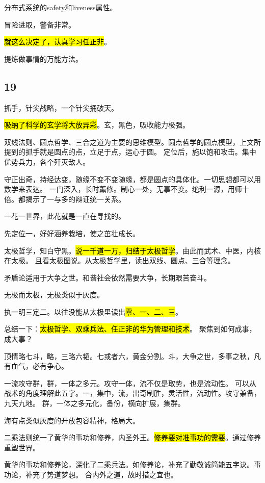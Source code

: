 分布式系统的safety和liveness属性。

冒险进取，警备非常。

\hl{就这么决定了，认真学习任正非}。

\hrulefill

提炼做事情的万能方法。

\subsection{19}

抓手，针尖战略，一个针尖捅破天。

\hl{吸纳了科学的玄学将大放异彩}。玄，黑色，吸收能力极强。

双线法则、圆点哲学、三合之道为主要的思维模型。圆点哲学的圆点模型，上文所提到的抓手就是圆点的点，立足于点，运心于圆。
定位后，施以饱和攻击。集中优势兵力，各个歼灭敌人。

守正出奇，持经达变，随缘不变不变随缘，都是圆点的具体化。一切思想都可以用数学来表达。
一门深入，长时薰修。制心一处，无事不变。绝利一源，用师十倍。都揭示了一与多的辩证统一关系。

一花一世界，此花就是一直在寻找的。

先定位一，好好涵养栽培，使之茁壮成长。

\hrulefill

太极哲学，知白守黑。\hl{说一千道一万，归结于太极哲学}。由此而武术、中医，内核在太极。
且看太极图说。从太极哲学里，读出双线、圆点、三合等理念。

矛盾论适用于大争之世。和谐社会依然需要大争，长期艰苦奋斗。

无极而太极，无极类似于灰度。

执一明三定二。以往没能从太极里读出\hl{零、一、二、三}。

总结一下：\hl{太极哲学、双乘兵法、任正非的华为管理和技术}。
聚焦到如何成事，成大事？

顶情略七斗，略，三略六韬。七或者六，黄金分割。斗，大争之世，多事之秋，凡有血气，必有争心。

一流攻守群，群，一体之多元。攻守一体，流不仅是取势，也是流动性。
可以从战术的角度理解此五字。一，集中，流，出奇制胜，灵活性，流动性。攻守兼备，九天九地。
群，一体之多元化，备份，横向扩展，集群。

海有点类似灰度的开放包容精神，格局大。

\hrulefill

二乘法则统一了黄华的事功和修养，内圣外王。\hl{修养要对准事功的需要}。通过修养重塑世界。

黄华的事功和修养论，深化了二乘兵法。如修养论，补充了勤敬诚简能五字诀。事功论，补充了势道梦想。
合内外之道，故时措之宜也。

